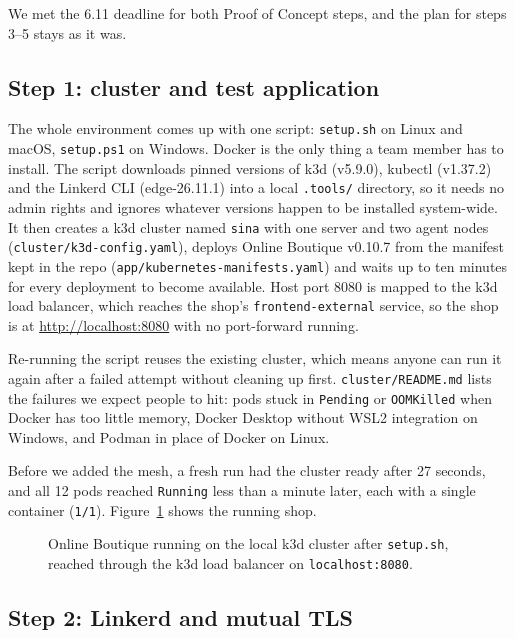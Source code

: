 \documentclass[12pt,a4paper]{article}
\begin{document}
We met the 6.11 deadline for both Proof of Concept steps, and the plan for
steps 3--5 stays as it was.

\subsection*{Step 1: cluster and test application}

The whole environment comes up with one script: \texttt{setup.sh} on Linux
and macOS, \texttt{setup.ps1} on Windows. Docker is the only thing a team
member has to install. The script downloads pinned versions of k3d (v5.9.0),
kubectl (v1.37.2) and the Linkerd CLI (edge-26.11.1) into a local
\texttt{.tools/} directory, so it needs no admin rights and ignores whatever
versions happen to be installed system-wide. It then creates a k3d cluster
named \texttt{sina} with one server and two agent nodes
(\texttt{cluster/k3d-config.yaml}), deploys Online Boutique v0.10.7 from the
manifest kept in the repo (\texttt{app/kubernetes-manifests.yaml}) and waits up
to ten minutes for every deployment to become available. Host port 8080 is
mapped to the k3d load balancer, which reaches the shop's
\texttt{frontend-external} service, so the shop is at
\url{http://localhost:8080} with no port-forward running.

Re-running the script reuses the existing cluster, which means anyone can run
it again after a failed attempt without cleaning up first.
\texttt{cluster/README.md} lists the failures we
expect people to hit: pods stuck in \texttt{Pending} or \texttt{OOMKilled}
when Docker has too little memory, Docker Desktop without WSL2 integration on
Windows, and Podman in place of Docker on Linux.

Before we added the mesh, a fresh run had the cluster ready after 27 seconds,
and all 12 pods reached \texttt{Running} less than a minute later, each with a
single container (\texttt{1/1}). Figure~\ref{fig:shop} shows the running shop.

\begin{figure}[h]
  \centering
  \caption{Online Boutique running on the local k3d cluster after
    \texttt{setup.sh}, reached through the k3d load balancer on
    \texttt{localhost:8080}.}
  \label{fig:shop}
\end{figure}

\subsection*{Step 2: Linkerd and mutual TLS}
\end{document}
